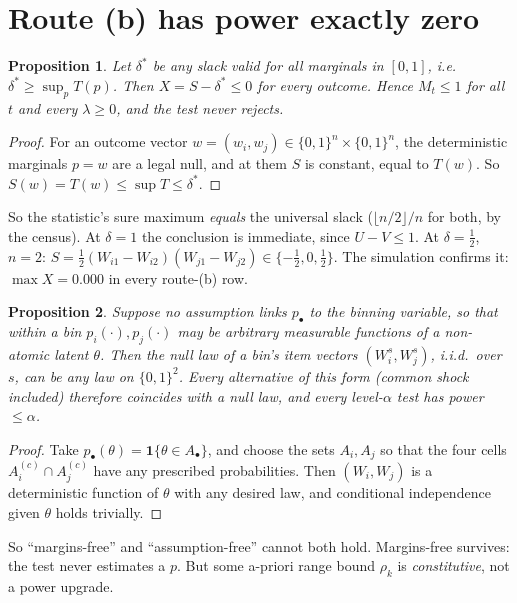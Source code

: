 \documentclass[11pt]{article}
\newtheorem{proposition}{Proposition}
\begin{document}
\section{Route (b) has power exactly zero}
\begin{proposition}\label{prop:zero}
Let $\delta^\ast$ be any slack valid for all marginals in $[0,1]$, i.e.\ $\delta^\ast\ge\sup_{p}T(p)$. Then $X=S-\delta^\ast\le0$ for every outcome. Hence $M_t\le1$ for all $t$ and every $\lambda\ge0$, and the test never rejects.
\end{proposition}
\begin{proof}
For an outcome vector $w=(w_i,w_j)\in\{0,1\}^n\times\{0,1\}^n$, the deterministic marginals $p=w$ are a legal null, and at them $S$ is constant, equal to $T(w)$. So $S(w)=T(w)\le\sup T\le\delta^\ast$.
\end{proof}
So the statistic's sure maximum \emph{equals} the universal slack ($\lfloor n/2\rfloor/n$ for both, by the census). At $\delta=1$ the conclusion is immediate, since $U-V\le1$. At $\delta=\frac12$, $n=2$: $S=\frac12(W_{i1}-W_{i2})(W_{j1}-W_{j2})\in\{-\frac12,0,\frac12\}$. The simulation confirms it: $\max X=0.000$ in every route-(b) row.

\begin{proposition}\label{prop:nonid}
Suppose no assumption links $p_\bullet$ to the binning variable, so that within a bin $p_i(\cdot),p_j(\cdot)$ may be arbitrary measurable functions of a non-atomic latent $\theta$. Then the null law of a bin's item vectors $(W_i^s,W_j^s)$, i.i.d.\ over $s$, can be \emph{any} law on $\{0,1\}^2$. Every alternative of this form (common shock included) therefore coincides with a null law, and every level-$\alpha$ test has power $\le\alpha$.
\end{proposition}
\begin{proof}
Take $p_\bullet(\theta)=\mathbf 1\{\theta\in A_\bullet\}$, and choose the sets $A_i,A_j$ so that the four cells $A_i^{(c)}\cap A_j^{(c)}$ have any prescribed probabilities. Then $(W_i,W_j)$ is a deterministic function of $\theta$ with any desired law, and conditional independence given $\theta$ holds trivially.
\end{proof}
So ``margins-free'' and ``assumption-free'' cannot both hold. Margins-free survives: the test never estimates a $p$. But some a-priori range bound $\rho_k$ is \emph{constitutive}, not a power upgrade.
\end{document}
